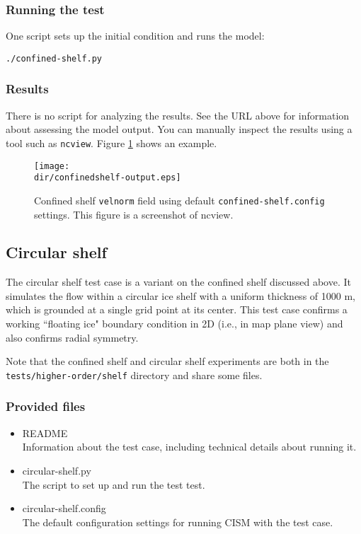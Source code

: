 \subsubsection{Running the test}
One script sets up the initial condition and runs the model:

\texttt{./confined-shelf.py}

\subsubsection{Results}
There is no script for analyzing the results.  See the URL above for information 
about assessing the model output.
You can manually inspect the results using a tool such as \texttt{ncview}.
Figure \ref{fig:confinedshelf-results} shows an example.

\begin{figure}[H!]
	\centering
	\texttt{[image: \\dir/confinedshelf-output.eps]}
	\caption{Confined shelf \texttt{velnorm} field using default \texttt{confined-shelf.config} settings. This figure is a screenshot of ncview.}
	\label{fig:confinedshelf-results}
\end{figure}
\FloatBarrier

\subsection{Circular shelf}
The circular shelf test case is a variant on the confined shelf discussed above. It simulates the flow within a circular ice shelf with a uniform thickness
of 1000 m, which is grounded at a single grid point at its center. This test case confirms a working ``floating ice" boundary condition
in 2D (i.e., in map plane view) and also confirms radial symmetry. 

Note that the confined shelf and circular shelf experiments are both in the 
\texttt{tests/higher-order/shelf} directory and share some files.

\subsubsection{Provided files}

\begin{itemize}
	\item README \\
		Information about the test case, including technical details about running it.
	\item circular-shelf.py \\
		The script to set up and run the test test.
	\item circular-shelf.config \\
          The default configuration settings for running CISM with the test case.
\end{itemize}

